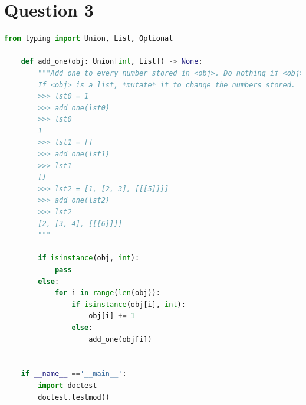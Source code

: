 \documentclass[12pt]{article}
\begin{document}
\section*{Question 3}
\begin{lstlisting}[language=python,caption={worksheet\_17\_q3\_solution.py}]
    from typing import Union, List, Optional

    def add_one(obj: Union[int, List]) -> None:
        """Add one to every number stored in <obj>. Do nothing if <obj> is an int.
        If <obj> is a list, *mutate* it to change the numbers stored.
        >>> lst0 = 1
        >>> add_one(lst0)
        >>> lst0
        1
        >>> lst1 = []
        >>> add_one(lst1)
        >>> lst1
        []
        >>> lst2 = [1, [2, 3], [[[5]]]]
        >>> add_one(lst2)
        >>> lst2
        [2, [3, 4], [[[6]]]]
        """

        if isinstance(obj, int):
            pass
        else:
            for i in range(len(obj)):
                if isinstance(obj[i], int):
                    obj[i] += 1
                else:
                    add_one(obj[i])


    if __name__ =='__main__':
        import doctest
        doctest.testmod()
\end{lstlisting}
\end{document}
